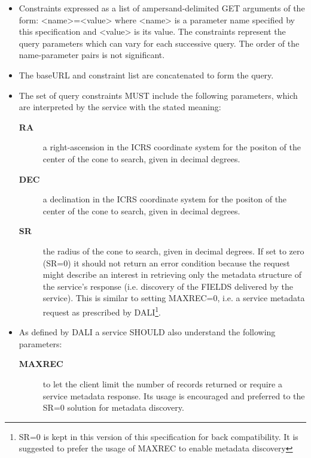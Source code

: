 \documentclass[11pt,a4paper]{ivoa}
\begin{document}
\begin{itemize}
		\item Constraints expressed as a list of
			ampersand-delimited GET arguments of the form: <name>=<value> where
			<name> is a parameter name specified by this specification and <value>
			is its value. The constraints represent the query parameters which can
			vary for each successive query. The order of the name-parameter pairs is
			not significant.
		\item The baseURL and constraint list are concatenated
			to form the query. 
		\item The set of query constraints MUST include the
			following parameters, which are interpreted by the service with the
			stated meaning: 
			\begin{description}
				\item[\textbf{RA}] a right-ascension
					in the ICRS coordinate system for the positon of the center of the cone
					to search, given in decimal degrees.
				\item[\textbf{DEC}] a declination
					in the ICRS coordinate system for the positon of the center of the cone
					to search, given in decimal degrees.
				\item[\textbf{SR}] the radius of the cone to search, given in decimal degrees.
					If set to zero (SR=0) it should not return an error condition because the
					request might describe an interest in retrieving only the metadata structure
					of the service's response (i.e. discovery of the FIELDS delivered by the service).
					This is similar to setting MAXREC=0, i.e. a service metadata request as prescribed
					by DALI\footnote{SR=0 is kept in this version of this specification for back
					compatibility. It is suggested to prefer the usage of MAXREC to enable metadata
					discovery}\citep{2017ivoa.spec.0517D}.
			\end{description}
		\item As defined by DALI a service SHOULD also understand the following parameters:
			\begin{description}
				\item[\textbf{MAXREC}] to let the client limit the number of records returned
					or require a service metadata response. Its usage is encouraged and preferred
					to the SR=0 solution for metadata discovery.

\end{description}
\end{itemize}
\end{document}
